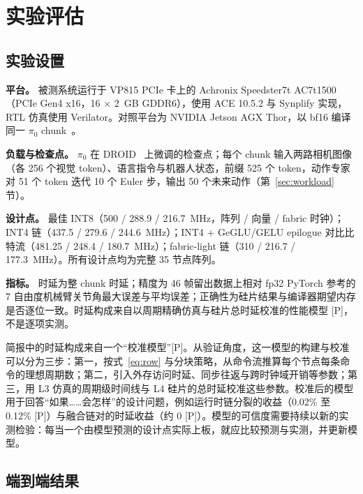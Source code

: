\documentclass[a4paper,10.5pt]{ctexart}
\newcommand{\tP}{\textsf{[P]}}              %
\newcommand{\pizero}{$\pi_0$}
\begin{document}
\section{实验评估}\label{sec:perf}

\subsection{实验设置}\label{sec:setup}

\textbf{平台。} 被测系统运行于 VP815 PCIe 卡上的 Achronix Speedster7t AC7t1500（PCIe Gen4 x16，16 $\times$ 2~GB GDDR6），使用 ACE 10.5.2 与 Synplify 实现，RTL 仿真使用 Verilator。对照平台为 NVIDIA Jetson AGX Thor，以 bf16 编译同一 \pizero{} chunk~\cite{thor}。

\textbf{负载与检查点。} \pizero{} 在 DROID~\cite{droid} 上微调的检查点；每个 chunk 输入两路相机图像（各 256 个视觉 token）、语言指令与机器人状态，前缀 525 个 token，动作专家对 51 个 token 迭代 10 个 Euler 步，输出 50 个未来动作（第~\ref{sec:workload} 节）。

\textbf{设计点。} 最佳 INT8（500 / 288.9 / 216.7~MHz，阵列 / 向量 / fabric 时钟）；INT4 链（437.5 / 279.6 / 244.6~MHz）；INT4 + GeGLU/GELU epilogue 对比比特流（481.25 / 248.4 / 180.7~MHz）；fabric-light 链（310 / 216.7 / 177.3~MHz）。所有设计点均为完整 35 节点阵列。

\textbf{指标。} 时延为整 chunk 时延；精度为 46 帧留出数据上相对 fp32 PyTorch 参考的 7 自由度机械臂关节角最大误差与平均误差；正确性为硅片结果与编译器期望内存是否逐位一致。时延构成来自以周期精确仿真与硅片总时延校准的性能模型 \tP，不是逐项实测。

简报中的时延构成来自一个“校准模型”\tP。从验证角度，这一模型的构建与校准可以分为三步：第一，按式~\eqref{eq:row} 与分块策略，从命令流推算每个节点每条命令的理想周期数；第二，引入外存访问时延、同步往返与跨时钟域开销等参数；第三，用 L3 仿真的周期级时间线与 L4 硅片的总时延校准这些参数。校准后的模型用于回答“如果……会怎样”的设计问题，例如运行时链分裂的收益（0.02\% 至 0.12\% \tP）与融合链对的时延收益（约 0 \tP）。模型的可信度需要持续以新的实测检验：每当一个由模型预测的设计点实际上板，就应比较预测与实测，并更新模型。

\subsection{端到端结果}\label{sec:results}
\end{document}

